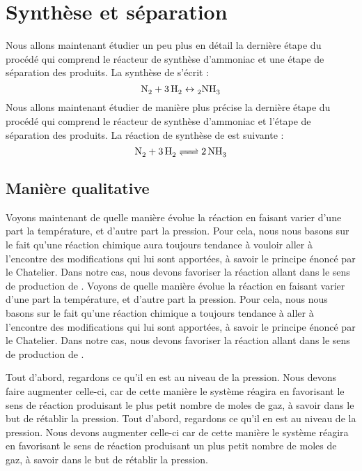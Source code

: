 \documentclass[10pt,a4paper]{article}
\begin{document}
\section{Synthèse  et séparation}

Nous allons maintenant étudier un peu plus en détail la dernière étape du procédé qui comprend le réacteur de synthèse d’ammoniac et une étape de séparation des produits.
La synthèse de  s'écrit :
$$ \ce{N_2 + 3H_2 \leftrightarrow 2NH_3}$$
Nous allons maintenant étudier de manière plus précise la dernière étape du procédé qui comprend le réacteur de synthèse d’ammoniac et l'étape de séparation des produits.
La réaction de synthèse de  est suivante :
$$ \ce{N_2 + 3H2 <=> 2NH3}$$

\subsection{Manière qualitative}
Voyons maintenant de quelle manière évolue la réaction en faisant varier d'une part la température, et d'autre part la pression. Pour cela, nous nous basons sur le fait qu'une réaction chimique aura toujours tendance à vouloir aller à l'encontre des modifications qui lui sont apportées, à savoir le principe énoncé par le Chatelier. Dans notre cas, nous devons favoriser la réaction allant dans le sens de production de .
Voyons de quelle manière évolue la réaction en faisant varier d'une part la température, et d'autre part la pression. Pour cela, nous nous basons sur le fait qu'une réaction chimique a toujours tendance à   aller à l'encontre des modifications qui lui sont apportées, à savoir le principe énoncé par le Chatelier. Dans notre cas, nous devons favoriser la réaction allant dans le sens de production de .

Tout d'abord, regardons ce qu'il en est au niveau de la pression. Nous devons faire augmenter celle-ci, car de cette manière le système réagira en favorisant le sens de réaction produisant le plus petit nombre de moles de gaz, à savoir  dans le but de rétablir la pression. 
Tout d'abord, regardons ce qu'il en est au niveau de la pression. Nous devons augmenter celle-ci car de cette manière le système réagira en favorisant le sens de réaction produisant un plus petit nombre de moles de gaz, à savoir  dans le but de rétablir la pression. 
\end{document}
